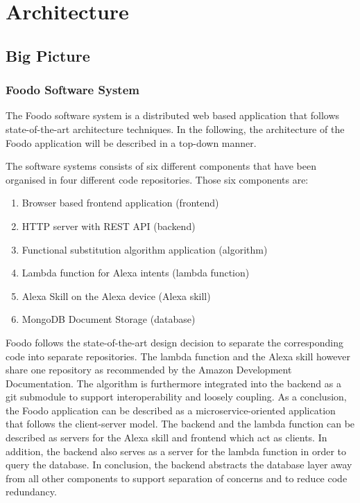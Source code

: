 \chapter{Architecture}
\section{Big Picture}
\subsection{Foodo Software System}
The Foodo software system is a distributed web based application that follows state-of-the-art architecture techniques. In the following, the architecture of the Foodo application will be described in a top-down manner.
 
The software systems consists of six different components that have been organised in four different code repositories. Those six components are:
\begin{enumerate}
	\itemsep-0.5em 
	\item Browser based frontend application (frontend)
	\item HTTP server with REST API (backend)
	\item Functional substitution algorithm application (algorithm)
	\item Lambda function for Alexa intents (lambda function)
	\item Alexa Skill on the Alexa device (Alexa skill)
	\item MongoDB Document Storage (database)
\end{enumerate}

Foodo follows the state-of-the-art design decision to separate the corresponding code into separate repositories. The lambda function and the Alexa skill however share one repository as recommended by the Amazon Development Documentation. The algorithm is furthermore integrated into the backend as a git submodule to support interoperability and loosely coupling. As a conclusion, the Foodo application can be described as a microservice-oriented application that follows the client-server model. The backend and the lambda function can be described as servers for the Alexa skill and frontend which act as clients. In addition, the backend also serves as a server for the lambda function in order to query the database. In conclusion, the backend abstracts the database layer away from all other components to support separation of concerns and to reduce code redundancy. 

